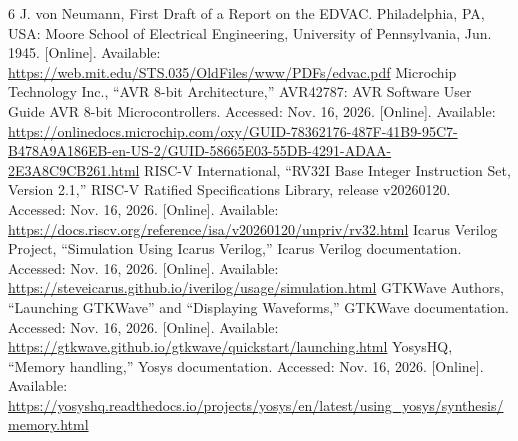 \documentclass[conference,letterpaper]{IEEEtran}
\begin{document}
\begin{thebibliography}{6}
 J. von Neumann, First Draft of a Report on the EDVAC. Philadelphia, PA, USA: Moore School of Electrical Engineering, University of Pennsylvania, Jun. 1945. [Online]. Available: \url{https://web.mit.edu/STS.035/OldFiles/www/PDFs/edvac.pdf}
 Microchip Technology Inc., ``AVR 8-bit Architecture,'' AVR42787: AVR Software User Guide AVR 8-bit Microcontrollers. Accessed: Nov. 16, 2026. [Online]. Available: \url{https://onlinedocs.microchip.com/oxy/GUID-78362176-487F-41B9-95C7-B478A9A186EB-en-US-2/GUID-58665E03-55DB-4291-ADAA-2E3A8C9CB261.html}
 RISC-V International, ``RV32I Base Integer Instruction Set, Version 2.1,'' RISC-V Ratified Specifications Library, release v20260120. Accessed: Nov. 16, 2026. [Online]. Available: \url{https://docs.riscv.org/reference/isa/v20260120/unpriv/rv32.html}
 Icarus Verilog Project, ``Simulation Using Icarus Verilog,'' Icarus Verilog documentation. Accessed: Nov. 16, 2026. [Online]. Available: \url{https://steveicarus.github.io/iverilog/usage/simulation.html}
 GTKWave Authors, ``Launching GTKWave'' and ``Displaying Waveforms,'' GTKWave documentation. Accessed: Nov. 16, 2026. [Online]. Available: \url{https://gtkwave.github.io/gtkwave/quickstart/launching.html}
 YosysHQ, ``Memory handling,'' Yosys documentation. Accessed: Nov. 16, 2026. [Online]. Available: \url{https://yosyshq.readthedocs.io/projects/yosys/en/latest/using_yosys/synthesis/memory.html}
\end{thebibliography}
\end{document}
